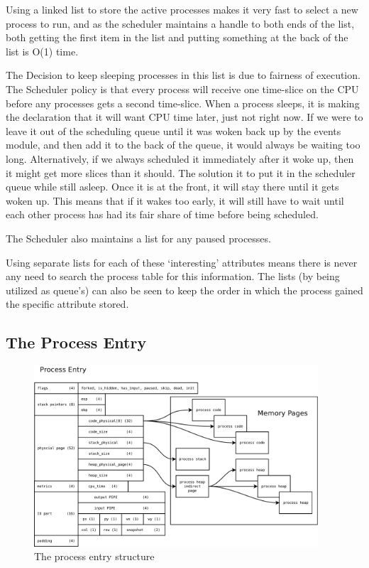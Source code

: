 \documentclass[a4paper]{report}
\begin{document}
Using a linked list to store the active processes makes it very fast to select a new process to run, and as the scheduler maintains a handle to both ends of the list, both getting the first item in the list and putting something at the back of the list is O(1) time.

The Decision to keep sleeping processes in this list is due to fairness of execution. The Scheduler policy is that every process will receive one time-slice on the CPU before any processes gets a second time-slice. When a process sleeps, it is making the declaration that it will want CPU time later, just not right now. If we were to leave it out of the scheduling queue until it was woken back up by the events module, and then add it to the back of the queue, it would always be waiting too long. Alternatively, if we always scheduled it immediately after it woke up, then it might get more slices than it should. The solution it to put it in the scheduler queue while still asleep. Once it is at the front, it will stay there until it gets woken up. This means that if it wakes too early, it will still have to wait until each other process has had its fair share of time before being scheduled.

The Scheduler also maintains a list for any paused processes.

Using separate lists for each of these `interesting' attributes means there is never any need to search the process table for this information. The lists (by being utilized as queue's) can also be seen to keep the order in which the process gained the specific attribute stored.

\clearpage
\subsection{The Process Entry}

\begin{figure}[ht]
\centering
\includegraphics[width=400px]{images/Process_Entry_Structure}
\caption{The process entry structure}
\label{fig:WinTitleBarScreen}
\end{figure}
\end{document}
